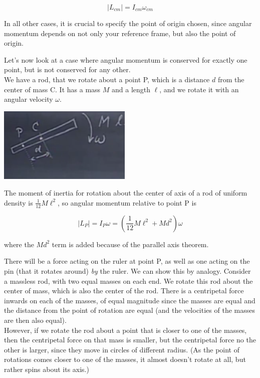 \documentclass[8.01x]{subfiles}
\begin{document}
\begin{equation}
|L_{cm}| = I_{cm} \omega_{cm}
\end{equation}

In all other cases, it is crucial to specify the point of origin chosen, since angular momentum depends on not only your reference frame, but also the point of origin.

Let's now look at a case where angular momentum is conserved for exactly one point, but is not conserved for any other.\\
We have a rod, that we rotate about a point P, which is a distance $d$ from the center of mass C. It has a mass $M$ and a length $\ell$, and we rotate it with an angular velocity $\omega$.

\begin{center}
\includegraphics[scale=0.7]{Graphics/lec21_rod}
\end{center}

The moment of inertia for rotation about the center of axis of a rod of uniform density is $\displaystyle \frac{1}{12} M \ell^2$, so angular momentum relative to point P is

\begin{equation}
|L_P| = I_P \omega = \left(\frac{1}{12} M \ell^2 + M d^2\right) \omega
\end{equation}

where the $M d^2$ term is added because of the parallel axis theorem.

There will be a force acting on the ruler at point P, as well as one acting on the pin (that it rotates around) \emph{by} the ruler. We can show this by analogy. Consider a massless rod, with two equal masses on each end. We rotate this rod about the center of mass, which is also the center of the rod. There is a centripetal force inwards on each of the masses, of equal magnitude since the masses are equal and the distance from the point of rotation are equal (and the velocities of the masses are then also equal).\\
However, if we rotate the rod about a point that is closer to one of the masses, then the centripetal force on that mass is smaller, but the centripetal force no the other is larger, since they move in circles of different radius. (As the point of rotations comes closer to one of the masses, it almost doesn't rotate at all, but rather spins about its axis.)
\end{document}
